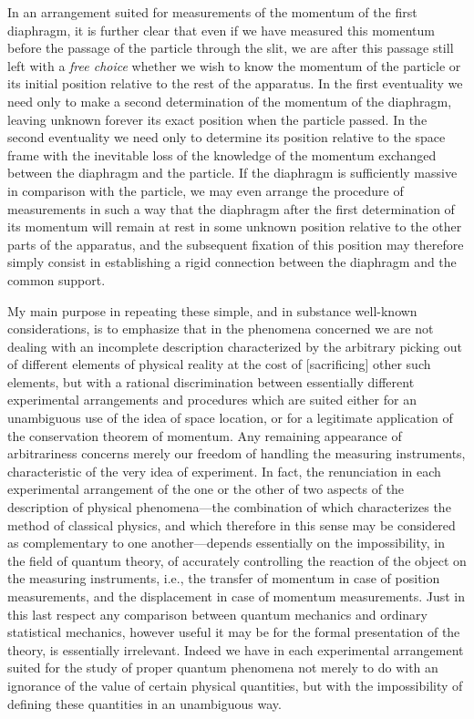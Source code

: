 \documentclass[11pt]{memoir}
\begin{document}
In an arrangement suited for measurements of the momentum of the first
diaphragm, it is further clear that even if we have measured this
momentum before the passage of the particle through the slit, we are
after this passage still left with a \emph{free choice} whether we wish
to know the momentum of the particle or its initial position relative to
the rest of the apparatus. In the first eventuality we need only to make
a second determination of the momentum of the diaphragm, leaving unknown
forever its exact position when the particle passed. In the second
eventuality we need only to determine its position relative to the space
frame with the inevitable loss of the knowledge of the momentum
exchanged between the diaphragm and the particle. If the diaphragm is
sufficiently massive in comparison with the particle, we may even
arrange the procedure of measurements in such a way that the diaphragm
after the first determination of its momentum will remain at rest in
some unknown position relative to the other parts of the apparatus, and
the subsequent fixation of this position may therefore simply consist in
establishing a rigid connection between the diaphragm and the common
support.

My main purpose in repeating these simple, and in substance well-known
considerations, is to emphasize that in the phenomena concerned we are
not dealing with an incomplete description characterized by the
arbitrary picking out of different elements of physical reality at the
cost of {[}sacrificing{]} other such elements, but with a rational
discrimination between essentially different experimental arrangements
and procedures which are suited either for an unambiguous use of the
idea of space location, or for a legitimate application of the
conservation theorem of momentum. Any remaining appearance of
arbitrariness concerns merely our freedom of handling the measuring
instruments, characteristic of the very idea of experiment. In fact, the
renunciation in each experimental arrangement of the one or the other of
two aspects of the description of physical phenomena---the combination
of which characterizes the method of classical physics, and which
therefore in this sense may be considered as complementary to one
another---depends essentially on the impossibility, in the field of
quantum theory, of accurately controlling the reaction of the object on
the measuring instruments, i.e., the transfer of momentum in case of
position measurements, and the displacement in case of momentum
measurements. Just in this last respect any comparison between quantum
mechanics and ordinary statistical mechanics, however useful it may be
for the formal presentation of the theory, is essentially irrelevant.
Indeed we have in each experimental arrangement suited for the study of
proper quantum phenomena not merely to do with an ignorance of the value
of certain physical quantities, but with the impossibility of defining
these quantities in an unambiguous way.
\end{document}
